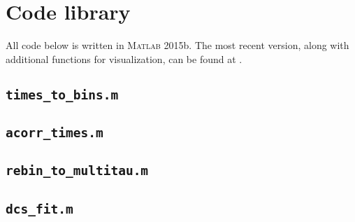 %



\appendix
\chapter{Code library}

All code below is written in \textsc{Matlab} 2015b. The most recent version, along with additional functions for visualization, can be found at \coderepolink.

\section{\texttt{times\_to\_bins.m}} \label{code:times_to_bins}


\section{\texttt{acorr\_times.m}} \label{code:acorr_times}


\section{\texttt{rebin\_to\_multitau.m}} \label{code:rebin_to_multitau}


\section{\texttt{dcs\_fit.m}} \label{code:dcs_fit}



